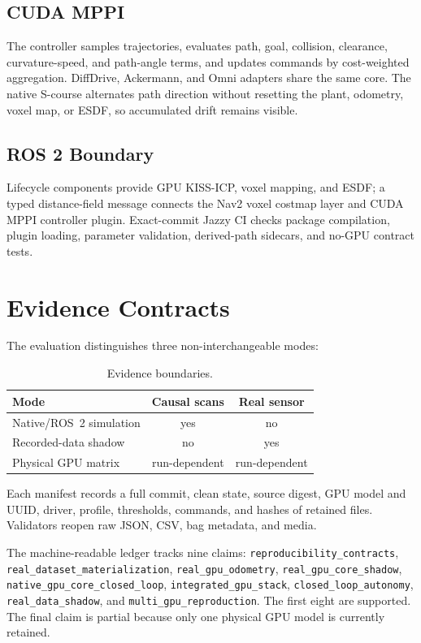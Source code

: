 \documentclass[conference]{IEEEtran}
\begin{document}
\subsection{CUDA MPPI}
The controller samples trajectories, evaluates path, goal, collision,
clearance, curvature-speed, and path-angle terms, and updates commands by
cost-weighted aggregation. DiffDrive, Ackermann, and Omni adapters share the
same core. The native S-course alternates path direction without resetting the
plant, odometry, voxel map, or ESDF, so accumulated drift remains visible.

\subsection{ROS 2 Boundary}
Lifecycle components provide GPU KISS-ICP, voxel mapping, and ESDF; a typed
distance-field message connects the Nav2 voxel costmap layer and CUDA MPPI
controller plugin. Exact-commit Jazzy CI checks package compilation, plugin
loading, parameter validation, derived-path sidecars, and no-GPU contract
tests.

\section{Evidence Contracts}
The evaluation distinguishes three non-interchangeable modes:
\begin{table}[t]
\centering
\caption{Evidence boundaries.}
\label{tab:evidence}
\small
\begin{tabular}{lcc}
\toprule
Mode & Causal scans & Real sensor \\
\midrule
Native/ROS~2 simulation & yes & no \\
Recorded-data shadow & no & yes \\
Physical GPU matrix & run-dependent & run-dependent \\
\bottomrule
\end{tabular}
\end{table}
Each manifest records a full commit, clean state, source digest, GPU model and
UUID, driver, profile, thresholds, commands, and hashes of retained files.
Validators reopen raw JSON, CSV, bag metadata, and media.

The machine-readable ledger tracks nine claims:
\texttt{reproducibility\_contracts},
\texttt{real\_dataset\_materialization},
\texttt{real\_gpu\_odometry},
\texttt{real\_gpu\_core\_shadow},
\texttt{native\_gpu\_core\_closed\_loop},
\texttt{integrated\_gpu\_stack},
\texttt{closed\_loop\_autonomy},
\texttt{real\_data\_shadow}, and
\texttt{multi\_gpu\_reproduction}. The first eight are supported. The final
claim is partial because only one physical GPU model is currently retained.
\end{document}
